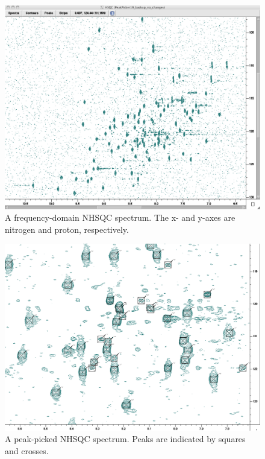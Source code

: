 \begin{figure}
  \includegraphics[scale=0.35]{figures/nhsqc}
  \caption[A frequency-domain NHSQC spectrum]
          {A frequency-domain NHSQC spectrum. 
           The x- and y-axes are nitrogen and proton, respectively.}
  \label{nhsqc}
\end{figure}

\begin{figure}
  \includegraphics[scale=0.35]{figures/nhsqc_peaks}
  \caption[A peak-picked NHSQC spectrum]
          {A peak-picked NHSQC spectrum. 
           Peaks are indicated by squares and crosses.}
  \label{nhsqc_peaks}
\end{figure}

